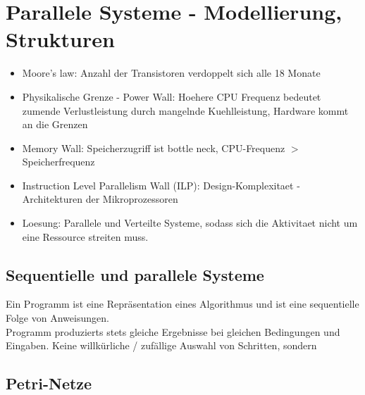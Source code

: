 \chapter{Parallele Systeme - Modellierung, Strukturen}
\begin{itemize}
	\setlength\itemsep{0em}
	\item Moore's law: Anzahl der Transistoren verdoppelt sich alle 18 Monate
	\item Physikalische Grenze - Power Wall: Hoehere CPU Frequenz bedeutet zumende Verlustleistung durch mangelnde Kuehlleistung, Hardware kommt an die Grenzen
	\item Memory Wall: Speicherzugriff ist bottle neck, CPU-Frequenz $>$ Speicherfrequenz
	\item Instruction Level Parallelism Wall (ILP): Design-Komplexitaet - Architekturen der Mikroprozessoren
	\item Loesung: Parallele und Verteilte Systeme, sodass sich die Aktivitaet nicht um eine Ressource streiten muss. 
\end{itemize}

\section{Sequentielle und parallele Systeme}
Ein Programm ist eine Repräsentation eines Algorithmus und ist eine sequentielle Folge von Anweisungen. \\
 Programm produzierts stets gleiche Ergebnisse bei gleichen Bedingungen und Eingaben.  Keine willkürliche / zufällige Auswahl von Schritten, sondern 

\section{Petri-Netze}



